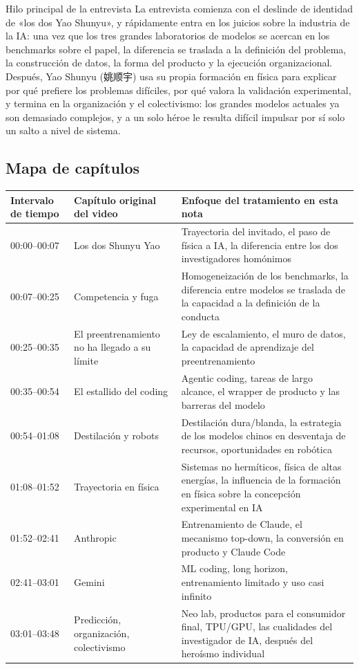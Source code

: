 \begin{knowledgebox}{Hilo principal de la entrevista}
La entrevista comienza con el deslinde de identidad de «los dos Yao Shunyu», y rápidamente entra en los juicios sobre la industria de la IA: una vez que los tres grandes laboratorios de modelos se acercan en los benchmarks sobre el papel, la diferencia se traslada a la definición del problema, la construcción de datos, la forma del producto y la ejecución organizacional. Después, Yao Shunyu (姚顺宇) usa su propia formación en física para explicar por qué prefiere los problemas difíciles, por qué valora la validación experimental, y termina en la organización y el colectivismo: los grandes modelos actuales ya son demasiado complejos, y a un solo héroe le resulta difícil impulsar por sí solo un salto a nivel de sistema.
\end{knowledgebox}

\subsection{Mapa de capítulos}

\noindent\begin{longtable}{p{}p{}p{}}
\toprule
Intervalo de tiempo & Capítulo original del video & Enfoque del tratamiento en esta nota \\
\midrule
00:00--00:07 & Los dos Shunyu Yao & Trayectoria del invitado, el paso de física a IA, la diferencia entre los dos investigadores homónimos \\
00:07--00:25 & Competencia y fuga & Homogeneización de los benchmarks, la diferencia entre modelos se traslada de la capacidad a la definición de la conducta \\
00:25--00:35 & El preentrenamiento no ha llegado a su límite & Ley de escalamiento, el muro de datos, la capacidad de aprendizaje del preentrenamiento \\
00:35--00:54 & El estallido del coding & Agentic coding, tareas de largo alcance, el wrapper de producto y las barreras del modelo \\
00:54--01:08 & Destilación y robots & Destilación dura/blanda, la estrategia de los modelos chinos en desventaja de recursos, oportunidades en robótica \\
01:08--01:52 & Trayectoria en física & Sistemas no hermíticos, física de altas energías, la influencia de la formación en física sobre la concepción experimental en IA \\
01:52--02:41 & Anthropic & Entrenamiento de Claude, el mecanismo top-down, la conversión en producto y Claude Code \\
02:41--03:01 & Gemini & ML coding, long horizon, entrenamiento limitado y uso casi infinito \\
03:01--03:48 & Predicción, organización, colectivismo & Neo lab, productos para el consumidor final, TPU/GPU, las cualidades del investigador de IA, después del heroísmo individual \\
\bottomrule
\end{longtable}

